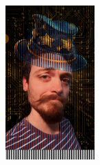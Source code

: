 \documentclass{article}
\begin{document}
\includegraphics[width=1.35in]{mag_gi_interlaced_horizontal.png}


\end{document}
